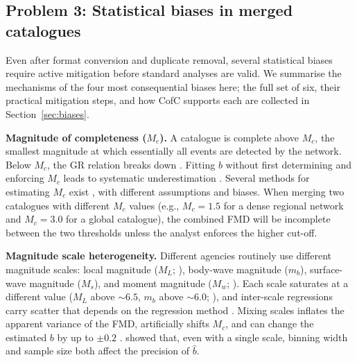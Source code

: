 \documentclass[12pt]{article}
\begin{document}
\subsection{Problem 3: Statistical biases in merged catalogues}
\label{sec:biasmech}

Even after format conversion and duplicate removal, several statistical biases
require active mitigation before standard analyses are valid.  We summarise the
mechanisms of the four most consequential biases here; the full set of six,
their practical mitigation steps, and how CofC supports each are collected in
Section~\ref{sec:biases}.

\textbf{Magnitude of completeness ($M_c$).}  A catalogue is complete above
$M_c$, the smallest magnitude at which essentially all events are
detected by the network.  Below $M_c$, the GR relation breaks down
\citep{rydelek1989}.  Fitting $b$ without first determining and enforcing
$M_c$ leads to systematic underestimation \citep{woessner2005}.  Several
methods for estimating $M_c$ exist \citep{wiemer2000,
caogao2002, woessner2005, mignan2012}, with different assumptions and biases.
When merging two catalogues with different $M_c$ values
(e.g., $M_c = 1.5$ for a dense regional network and $M_c = 3.0$ for a global
catalogue), the combined FMD will be incomplete between the two thresholds
unless the analyst enforces the higher cut-off.

\textbf{Magnitude scale heterogeneity.}  Different agencies routinely use
different magnitude scales: local magnitude ($M_L$; \citealt{richter1935}),
body-wave magnitude ($m_b$), surface-wave magnitude ($M_s$), and moment
magnitude ($M_w$; \citealt{hanks1979,kanamori1977}).  Each scale saturates at
a different value ($M_L$ above $\sim 6.5$, $m_b$ above $\sim 6.0$;
\citealt{bormann2009}), and inter-scale regressions carry scatter that depends
on the regression method \citep{das2011,castellaro2006}.
Mixing scales inflates the apparent variance of the
FMD, artificially shifts $M_c$, and can change the estimated $b$ by up to
$\pm 0.2$ \citep{marzocchi2003}.  \citet{tinti1987} showed that, even with a
single scale, binning width and sample size both affect the precision of
$\hat{b}$.
\end{document}
